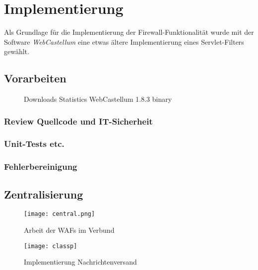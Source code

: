 \chapter{Implementierung}



Als Grundlage für die Implementierung der Firewall-Funktionalität wurde mit der Software \emph{WebCastellum} eine etwas ältere Implementierung eines Servlet-Filters gewählt.

\section{Vorarbeiten}

\begin{figure}[h]
  \centering
  \caption{Downloads Statistics WebCastellum 1.8.3 binary}
  \label{fig:downloadwc}
\end{figure}
  
\subsection{Review Quellcode und IT-Sicherheit}
\subsection{Unit-Tests etc.}
\subsection{Fehlerbereinigung}

\section{Zentralisierung}
\begin{figure}[ht]
    \centering
    \texttt{[image: central.png]}
    \caption{Arbeit der WAFs im Verbund}
    \label{fig:my_verbund}
\end{figure}

\begin{figure}[bht]
  \begin{center}
    \texttt{[image: classp]}
    \caption{Implementierung Nachrichtenversand}
    \label{fig.impversand}
  \end{center}
\end{figure}

